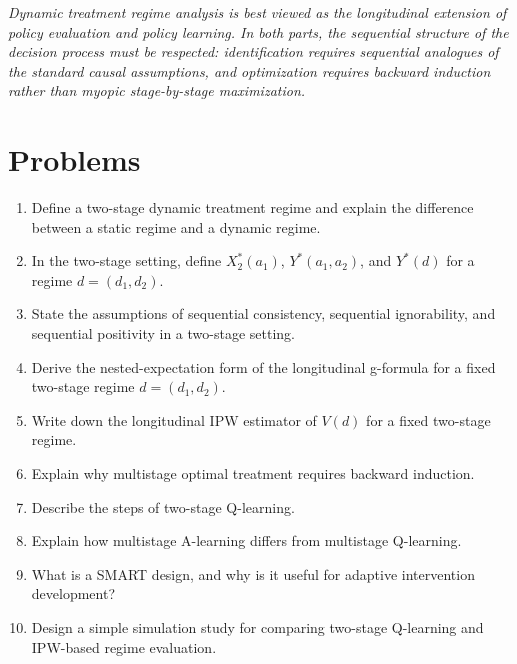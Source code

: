 \documentclass[master.tex]{subfiles}
\begin{document}
\medskip
\noindent\textit{Dynamic treatment regime analysis is best viewed as the longitudinal extension of policy evaluation and policy learning. In both parts, the sequential structure of the decision process must be respected: identification requires sequential analogues of the standard causal assumptions, and optimization requires backward induction rather than myopic stage-by-stage maximization.}

\section*{Problems}

\begin{enumerate}
    \item Define a two-stage dynamic treatment regime and explain the difference between a static regime and a dynamic regime.

    \item In the two-stage setting, define \(X_2^*(a_1)\), \(Y^*(a_1,a_2)\), and \(Y^*(d)\) for a regime \(d=(d_1,d_2)\).

    \item State the assumptions of sequential consistency, sequential ignorability, and sequential positivity in a two-stage setting.

    \item Derive the nested-expectation form of the longitudinal g-formula for a fixed two-stage regime \(d=(d_1,d_2)\).

    \item Write down the longitudinal IPW estimator of \(V(d)\) for a fixed two-stage regime.

    \item Explain why multistage optimal treatment requires backward induction.

    \item Describe the steps of two-stage Q-learning.

    \item Explain how multistage A-learning differs from multistage Q-learning.

    \item What is a SMART design, and why is it useful for adaptive intervention development?

    \item Design a simple simulation study for comparing two-stage Q-learning and IPW-based regime evaluation.
\end{enumerate}

\ifSubfilesClassLoaded{%
  
  
}{}
\end{document}
